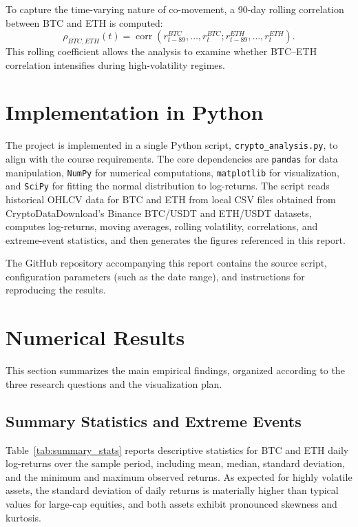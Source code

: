 \documentclass[conference]{IEEEtran}
\begin{document}
To capture the time-varying nature of co-movement, a 90-day rolling correlation between BTC and ETH is computed:
\[
\rho_{BTC,ETH}(t) =
\operatorname{corr}\left(
r^{BTC}_{t-89}, \dots, r^{BTC}_t;
r^{ETH}_{t-89}, \dots, r^{ETH}_t
\right).
\]
This rolling coefficient allows the analysis to examine whether BTC--ETH correlation intensifies during high-volatility regimes.

\section{Implementation in Python}
\label{sec:implementation}
The project is implemented in a single Python script, \texttt{crypto\_analysis.py}, to align with the course requirements. The core dependencies are \texttt{pandas} for data manipulation, \texttt{NumPy} for numerical computations, \texttt{matplotlib} for visualization, and \texttt{SciPy} for fitting the normal distribution to log-returns. The script reads historical OHLCV data for BTC and ETH from local CSV files obtained from CryptoDataDownload's Binance BTC/USDT and ETH/USDT datasets, computes log-returns, moving averages, rolling volatility, correlations, and extreme-event statistics, and then generates the figures referenced in this report.

The GitHub repository accompanying this report contains the source script, configuration parameters (such as the date range), and instructions for reproducing the results.

\section{Numerical Results}
\label{sec:results}
This section summarizes the main empirical findings, organized according to the three research questions and the visualization plan.

\subsection{Summary Statistics and Extreme Events}
Table~\ref{tab:summary_stats} reports descriptive statistics for BTC and ETH daily log-returns over the sample period, including mean, median, standard deviation, and the minimum and maximum observed returns.\cite{returnstats} As expected for highly volatile assets, the standard deviation of daily returns is materially higher than typical values for large-cap equities, and both assets exhibit pronounced skewness and kurtosis.
\end{document}

